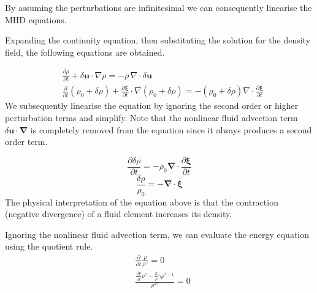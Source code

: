 By assuming the perturbations are infinitesimal we can consequently linearise the MHD equations.

Expanding the continuity equation, then substituting the solution for the density field, the following equations are obtained.

\begin{equation*}
  \begin{split}
       &\frac{\partial \rho}{\partial t} + \delta \boldsymbol{u}\cdot\nabla \rho
       = - \rho \, \nabla \cdot \delta\boldsymbol{u}\\
       &\frac{\partial }{\partial t}(\rho_0 + \delta \rho) + \frac{\partial \boldsymbol{\xi}}{\partial t} \cdot \nabla (\rho_0 +\delta \rho)
       = - (\rho_0 +\delta \rho) \nabla \cdot  \frac{\partial\boldsymbol{\xi}}{\partial t}
  \end{split}
\end{equation*}
We subsequently linearise the equation by ignoring the second order or higher perturbation terms and simplify. Note that the nonlinear fluid advection term \(\delta\boldsymbol{u} \cdot \boldsymbol\nabla\) is completely removed from the equation since it always produces a second order term.

\begin{equation*}
  \frac{\partial \delta \rho}{\partial t}
       = - \rho_0 \boldsymbol{\nabla} \cdot \frac{\partial\boldsymbol{\xi}}{\partial t}
\end{equation*}
\begin{equation}
    \frac{\delta \rho}{\rho_0}
    = - \boldsymbol{\nabla}\cdot \boldsymbol{\xi}
  \label{eq:Density pert}
\end{equation}
The physical interpretation of the equation above is that the contraction (negative divergence) of a fluid element increases its density.


Ignoring the nonlinear fluid advection term, we can evaluate the energy equation using the quotient rule. 
\begin{equation*}
  \begin{split}
       &\frac{\partial}{\partial t} \frac{p}{\rho^{\gamma}}
       = 0\\
       &\frac{\frac{\partial p }{\partial t} \rho^{\gamma}-\frac{p}{\rho} \gamma\rho^{\gamma-1}}{\rho^{2\gamma}}
       = 0
  \end{split}
\end{equation*}

